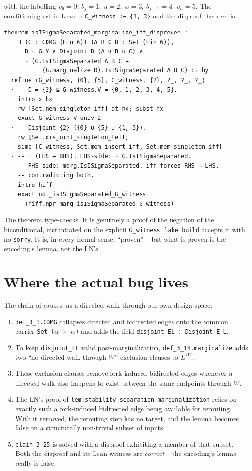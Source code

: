 \documentclass[11pt,a4paper]{article}
\providecommand{\sm}{\setminus}
\begin{document}
with the labelling $v_0 = 0,\ b_j = 1,\ u = 2,\ w = 3,\ b_{j+1} = 4,\
v_n = 5$. The conditioning set in Lean is
\texttt{C\_witness := \{1, 3\}} and the disproof theorem is:

\begin{lstlisting}
theorem isISigmaSeparated_marginalize_iff_disproved :
    ∃ (G : CDMG (Fin 6)) (A B C D : Set (Fin 6)),
      D ⊆ G.V ∧ Disjoint D (A ∪ B ∪ C) ∧
      ¬ (G.IsISigmaSeparated A B C ↔
           (G.marginalize D).IsISigmaSeparated A B C) := by
  refine ⟨G_witness, {0}, {5}, C_witness, {2}, ?_, ?_, ?_⟩
  · -- D = {2} ⊆ G_witness.V = {0, 1, 2, 3, 4, 5}.
    intro x hx
    rw [Set.mem_singleton_iff] at hx; subst hx
    exact G_witness_V_univ 2
  · -- Disjoint {2} ({0} ∪ {5} ∪ {1, 3}).
    rw [Set.disjoint_singleton_left]
    simp [C_witness, Set.mem_insert_iff, Set.mem_singleton_iff]
  · -- ¬ (LHS ↔ RHS). LHS-side: ¬ G.IsISigmaSeparated.
    -- RHS-side: marg.IsISigmaSeparated. iff forces RHS → LHS,
    -- contradicting both.
    intro hiff
    exact not_isISigmaSeparated_G_witness
      (hiff.mpr marg_isISigmaSeparated_G_witness)
\end{lstlisting}

The theorem type-checks. It is genuinely a proof of the negation of
the biconditional, instantiated on the explicit
\texttt{G\_witness}. \texttt{lake build} accepts it with no
\texttt{sorry}. It is, in every formal sense, ``proven'' -- but what
is proven is the encoding's lemma, not the LN's.

\section{Where the actual bug lives}

The chain of causes, as a directed walk through our own design space:

\begin{enumerate}
\item \texttt{def\_3\_1.CDMG} collapses directed and bidirected edges
      onto the common carrier \texttt{Set ($\alpha$ $\times$ $\alpha$)}
      and adds the field \texttt{disjoint\_EL : Disjoint E L}.
\item To keep \texttt{disjoint\_EL} valid post-marginalization,
      \texttt{def\_3\_14.marginalize} adds two ``no directed walk
      through $W$'' exclusion clauses to $L^{\sm W}$.
\item These exclusion clauses remove fork-induced bidirected edges
      whenever a directed walk also happens to exist between the
      same endpoints through $W$.
\item The LN's proof of
      \texttt{lem:stability\_separation\_marginalization} relies on
      exactly such a fork-induced bidirected edge being available
      for rerouting. With it removed, the rerouting step has no
      target, and the lemma becomes false on a structurally
      non-trivial subset of inputs.
\item \texttt{claim\_3\_25} is solved with a disproof exhibiting a
      member of that subset. Both the disproof and its Lean witness
      are \emph{correct} -- the encoding's lemma really is false.
\end{enumerate}
\end{document}
